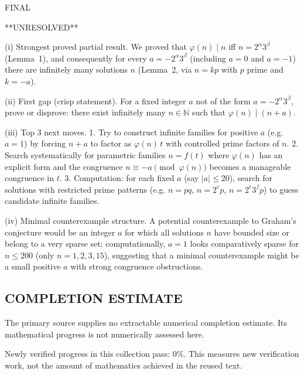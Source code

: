FINAL

**UNRESOLVED**

(i) Strongest proved partial result.
We proved that $\varphi(n)\mid n$ iff $n=2^\alpha 3^\beta$ (Lemma~1), and consequently for every $a=-2^\alpha 3^\beta$ (including $a=0$ and $a=-1$) there are infinitely many solutions $n$ (Lemma~2, via $n=kp$ with $p$ prime and $k=-a$).

(ii) First gap (crisp statement).
For a fixed integer $a$ not of the form $a=-2^\alpha 3^\beta$, prove or disprove: there exist infinitely many $n\in\mathbb{N}$ such that $\varphi(n)\mid (n+a)$.

(iii) Top 3 next moves.
1. Try to construct infinite families for positive $a$ (e.g. $a=1$) by forcing $n+a$ to factor as $\varphi(n)\,t$ with controlled prime factors of $n$.
2. Search systematically for parametric families $n=f(t)$ where $\varphi(n)$ has an explicit form and the congruence $n\equiv -a\pmod{\varphi(n)}$ becomes a manageable congruence in $t$.
3. Computation: for each fixed $a$ (say $|a|\le 20$), search for solutions with restricted prime patterns (e.g. $n=pq$, $n=2^e p$, $n=2^e 3^f p$) to guess candidate infinite families.

(iv) Minimal counterexample structure.
A potential counterexample to Graham's conjecture would be an integer $a$ for which all solutions $n$ have bounded size or belong to a very sparse set; computationally, $a=1$ looks comparatively sparse for $n\le 200$ (only $n=1,2,3,15$), suggesting that a minimal counterexample might be a small positive $a$ with strong congruence obstructions.



\subsection*{COMPLETION ESTIMATE}
The primary source supplies no extractable numerical completion estimate. Its mathematical progress is not numerically assessed here.

Newly verified progress in this collection pass: $0\%$. This measures new verification work, not the amount of mathematics achieved in the reused text.
